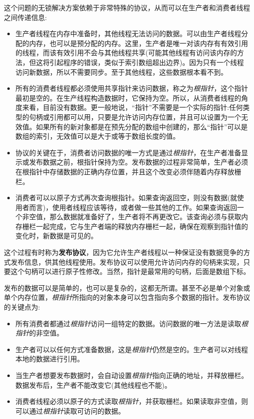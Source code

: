 这个问题的无锁解决方案依赖于非常特殊的协议，从而可以在生产者和消费者线程之间传递信息:

\begin{itemize}
\item 
生产者线程在内存中准备时，其他线程无法访问的数据。可以由生产者线程分配的内存，也可以是预分配的内存。这里，生产者是唯一对该内存有有效引用的线程，而该有效引用不会与其他线程共享(可能其他线程有访问该内存的方法，但这将引起程序的错误，类似于索引数组超出边界)。因为只有一个线程访问新数据，所以不需要同步。至于其他线程，这些数据根本看不到。

\item 
所有的消费者线程都必须使用共享指针来访问数据，称之为\textit{根指针}，这个指针最初是空的。在生产线程构造数据时，它保持为空。所以，从消费者线程的角度来看，目前没有数据。更一般地说，“指针”不需要是一个实际的指针:任何类型的句柄或引用都可以用，只要是允许访问内存位置，并且可以设置为一个无效值。如果所有的新对象都是在预先分配的数组中创建的，那么“指针”可以是数组的索引，无效值可以是大于或等于数组长度的值。

\item 
协议的关键在于，消费者访问数据的唯一方式是通过\textit{根指针}，在生产者准备显示或发布数据之前，根指针保持为空。发布数据的过程非常简单，生产者必须在根指针中存储数据的正确内存位置，并且这个改变必须伴随着内存释放栅栏。

\item 
消费者可以以原子方式再次查询根指针。如果查询返回空，则没有数据(就使用者而言)，使用者线程应该等待，或者做一些其他的工作。如果查询返回一个非空值，那么数据就准备好了，生产者将不再更改它。该查询必须与获取内存栅栏一起完成，它与生产者端的释放内存栅栏一起，确保在观察到指针值的变化时，新数据是可见的。
\end{itemize}

这个过程有时称为\textbf{发布协议}，因为它允许生产者线程以一种保证没有数据竞争的方式发布信息，供其他线程使用。发布协议可以使用允许访问内存的句柄来实现，只要这个句柄可以进行原子性修改。当然，指针是最常用的句柄，后面是数组下标。

发布的数据可以是简单的，也可以是复杂的，这都无所谓。甚至不必是单个对象或单个内存位置，\textit{根指针}所指向的对象本身可以包含指向多个数据的指针。发布协议的关键点为:

\begin{itemize}
\item
所有消费者都通过\textit{根指针}访问一组特定的数据。访问数据的唯一方法是读取\textit{根指针}的非空值。

\item
生产者可以以任何方式准备数据，这是\textit{根指针}仍然是空的。生产者可以对线程本地的数据进行引用。

\item 
当生产者想要发布数据时，会自动设置\textit{根指针}指向正确的地址，并释放栅栏。数据发布后，生产者不能改变它(其他线程也不能)。

\item 
消费者线程必须以原子的方式读取\textit{根指针}，并获取栅栏。如果读取非空值，则可以通过\textit{根指针}读取可访问的数据。

\end{itemize}

